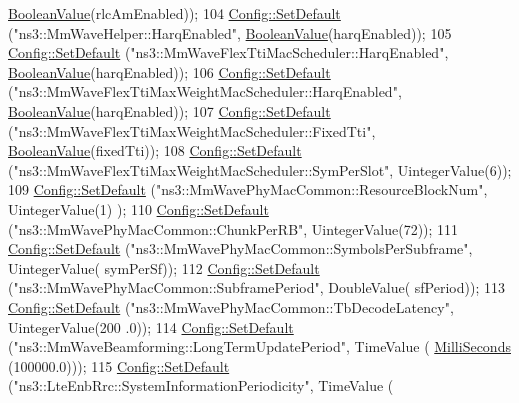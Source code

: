 \begin{DoxyCode}
      \hyperlink{classns3_1_1BooleanValue}{BooleanValue}(rlcAmEnabled));
104         \hyperlink{group__config_ga2e7882df849d8ba4aaad31c934c40c06}{Config::SetDefault} (\textcolor{stringliteral}{"ns3::MmWaveHelper::HarqEnabled"}, 
      \hyperlink{classns3_1_1BooleanValue}{BooleanValue}(harqEnabled));
105         \hyperlink{group__config_ga2e7882df849d8ba4aaad31c934c40c06}{Config::SetDefault} (\textcolor{stringliteral}{"ns3::MmWaveFlexTtiMacScheduler::HarqEnabled"}, 
      \hyperlink{classns3_1_1BooleanValue}{BooleanValue}(harqEnabled));
106         \hyperlink{group__config_ga2e7882df849d8ba4aaad31c934c40c06}{Config::SetDefault} (\textcolor{stringliteral}{"ns3::MmWaveFlexTtiMaxWeightMacScheduler::HarqEnabled"}, 
      \hyperlink{classns3_1_1BooleanValue}{BooleanValue}(harqEnabled));
107         \hyperlink{group__config_ga2e7882df849d8ba4aaad31c934c40c06}{Config::SetDefault} (\textcolor{stringliteral}{"ns3::MmWaveFlexTtiMaxWeightMacScheduler::FixedTti"}, 
      \hyperlink{classns3_1_1BooleanValue}{BooleanValue}(fixedTti));
108         \hyperlink{group__config_ga2e7882df849d8ba4aaad31c934c40c06}{Config::SetDefault} (\textcolor{stringliteral}{"ns3::MmWaveFlexTtiMaxWeightMacScheduler::SymPerSlot"}, 
      UintegerValue(6));
109         \hyperlink{group__config_ga2e7882df849d8ba4aaad31c934c40c06}{Config::SetDefault} (\textcolor{stringliteral}{"ns3::MmWavePhyMacCommon::ResourceBlockNum"}, UintegerValue(1)
      );
110         \hyperlink{group__config_ga2e7882df849d8ba4aaad31c934c40c06}{Config::SetDefault} (\textcolor{stringliteral}{"ns3::MmWavePhyMacCommon::ChunkPerRB"}, UintegerValue(72));
111         \hyperlink{group__config_ga2e7882df849d8ba4aaad31c934c40c06}{Config::SetDefault} (\textcolor{stringliteral}{"ns3::MmWavePhyMacCommon::SymbolsPerSubframe"}, UintegerValue(
      symPerSf));
112         \hyperlink{group__config_ga2e7882df849d8ba4aaad31c934c40c06}{Config::SetDefault} (\textcolor{stringliteral}{"ns3::MmWavePhyMacCommon::SubframePeriod"}, DoubleValue(
      sfPeriod));
113         \hyperlink{group__config_ga2e7882df849d8ba4aaad31c934c40c06}{Config::SetDefault} (\textcolor{stringliteral}{"ns3::MmWavePhyMacCommon::TbDecodeLatency"}, UintegerValue(200
      .0));
114         \hyperlink{group__config_ga2e7882df849d8ba4aaad31c934c40c06}{Config::SetDefault} (\textcolor{stringliteral}{"ns3::MmWaveBeamforming::LongTermUpdatePeriod"}, TimeValue (
      \hyperlink{group__timecivil_gaf26127cf4571146b83a92ee18679c7a9}{MilliSeconds} (100000.0)));
115         \hyperlink{group__config_ga2e7882df849d8ba4aaad31c934c40c06}{Config::SetDefault} (\textcolor{stringliteral}{"ns3::LteEnbRrc::SystemInformationPeriodicity"}, TimeValue (

\end{DoxyCode}
